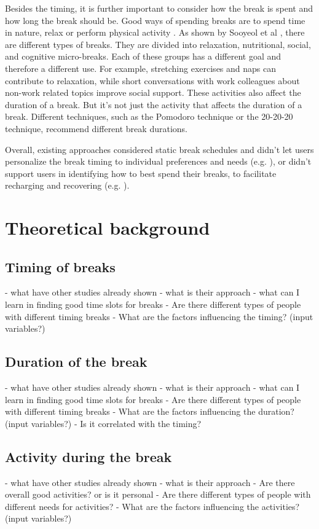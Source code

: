 \documentclass{hasel_thesis}
\begin{document}
 Besides the timing, it is further important to consider how the break is spent and how long the break should be. Good ways of spending breaks are to spend time in nature, relax or perform physical activity \cite{Bloom.2014} \cite{Largo-Wight.2017}.  As shown by Sooyeol et al \cite{KimS.ParkY.&Niu.2017}, there are different types of breaks. They are divided into relaxation, nutritional, social, and cognitive micro-breaks. Each of these groups has a different goal and therefore a different use. For example, stretching exercises and naps can contribute to relaxation, while short conversations with work colleagues about non-work related topics improve social support. These activities also affect the duration of a break. But it's not just the activity that affects the duration of a break. Different techniques, such as the Pomodoro technique or the 20-20-20 technique, recommend different break durations.

Overall, existing approaches considered static break schedules and didn’t let users personalize the break timing to individual preferences and needs (e.g. \cite{Henning.1997} \cite{Cooley.2013}), or didn’t support users in identifying how to best spend their breaks, to facilitate recharging and recovering (e.g. \cite{Kaur.2020}). 

 

\chapter{Theoretical background}
\section{Timing of breaks}
- what have other studies already shown
- what is their approach
- what can I learn in finding good time slots for breaks
- Are there different types of people with different timing breaks
- What are the factors influencing the timing? (input variables?)

\section{Duration of the break}
- what have other studies already shown
- what is their approach
- what can I learn in finding good time slots for breaks
- Are there different types of people with different timing breaks
- What are the factors influencing the duration? (input variables?)
- Is it correlated with the timing?

\section{Activity during the break}
- what have other studies already shown
- what is their approach
- Are there overall good activities? or is it personal
- Are there different types of people with different needs for activities?
- What are the factors influencing the activities? (input variables?)
\end{document}
